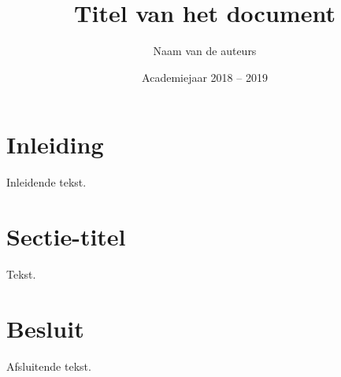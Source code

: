 \documentclass[a4paper,kulak]{kulakarticle} %
\date{Academiejaar 2018 -- 2019}
\title{Titel van het document}
\author{Naam van de auteurs}
\begin{document}
\maketitle

\section*{Inleiding}

Inleidende tekst.

\section{Sectie-titel}

Tekst.

\section*{Besluit}

Afsluitende tekst.
\end{document}
